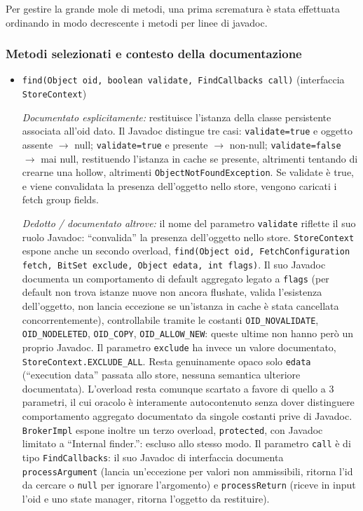Per gestire la grande mole di metodi, una prima scrematura è stata effettuata
ordinando in modo decrescente i metodi per linee di javadoc.

\subsubsection*{Metodi selezionati e contesto della documentazione}

\begin{itemize}[itemsep=12pt, parsep=7pt]
    \item \texttt{find(Object oid, boolean validate, FindCallbacks call)}
    (interfaccia \texttt{StoreContext})

    \textit{Documentato esplicitamente:} restituisce l'istanza della classe persistente
    associata all'oid dato. Il Javadoc distingue tre casi: \texttt{validate=true} e oggetto
    assente $\to$ null; \texttt{validate=true} e presente $\to$ non-null;
    \texttt{validate=false} $\to$ mai null, restituendo l'istanza in cache se presente,
    altrimenti tentando di crearne una hollow, altrimenti \texttt{ObjectNotFoundException}. Se validate è true, e viene
    convalidata la presenza dell'oggetto nello store, vengono caricati i fetch group fields.

    \textit{Dedotto / documentato altrove:} il nome del parametro \texttt{validate} riflette
    il suo ruolo Javadoc: ``convalida'' la presenza dell'oggetto nello store.
    \texttt{StoreContext} espone anche un secondo overload,
    \texttt{find(Object oid, FetchConfiguration fetch, BitSet exclude, Object edata, int
    flags)}. Il suo Javadoc documenta un comportamento di default aggregato legato a
    \texttt{flags} (per default non trova istanze nuove non ancora flushate, valida
    l'esistenza dell'oggetto, non lancia eccezione se un'istanza in cache è stata cancellata
    concorrentemente), controllabile tramite le costanti \texttt{OID\_NOVALIDATE},
    \texttt{OID\_NODELETED}, \texttt{OID\_COPY}, \texttt{OID\_ALLOW\_NEW}: queste ultime
    non hanno però un proprio Javadoc. Il parametro \texttt{exclude} ha invece un
    valore documentato, \texttt{StoreContext.EXCLUDE\_ALL}. Resta genuinamente opaco solo \texttt{edata}
    (``execution data'' passata allo store, nessuna semantica ulteriore documentata).
    L'overload resta comunque scartato a favore di quello a 3 parametri, il cui oracolo è
    interamente autocontenuto senza dover distinguere comportamento aggregato documentato
    da singole costanti prive di Javadoc. \texttt{BrokerImpl}
    espone inoltre un terzo overload, \texttt{protected}, con Javadoc limitato a
    ``Internal finder.'': escluso allo stesso modo. Il parametro \texttt{call} è di tipo
    \texttt{FindCallbacks}: il suo Javadoc di interfaccia
    documenta \texttt{processArgument} (lancia un'eccezione per valori non ammissibili,
    ritorna l'id da cercare o \texttt{null} per ignorare l'argomento) e
    \texttt{processReturn} (riceve in input l'oid e uno state manager, ritorna l'oggetto da
    restituire).


\end{itemize}
